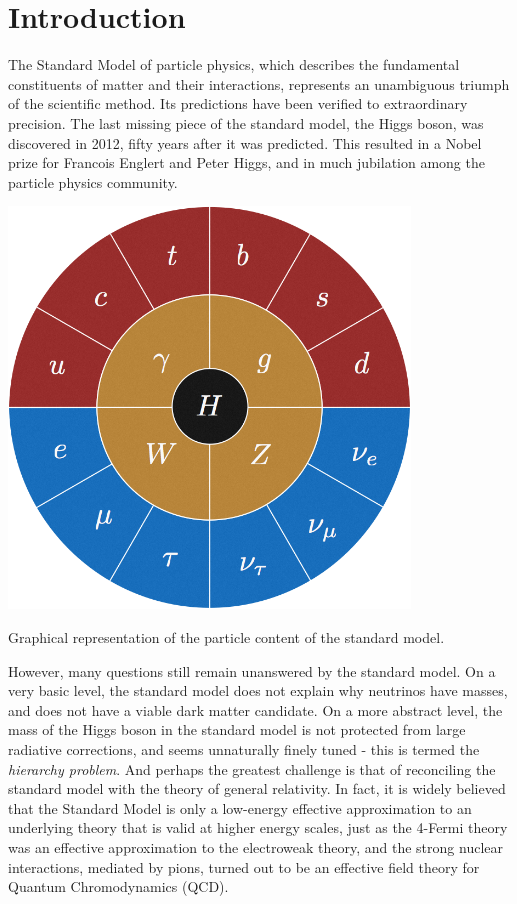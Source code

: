 \chapter{Introduction}

The Standard Model of particle physics, which describes the fundamental constituents of matter and their interactions, represents an unambiguous triumph of the scientific method. Its predictions have been verified to extraordinary precision. The last missing piece of the standard model, the Higgs boson, was discovered in 2012, fifty years after it was predicted. This resulted in a Nobel prize for Francois Englert and Peter Higgs, and in much jubilation among the particle physics community. 

\begin{marginfigure}
  \centering
  \includegraphics[width=0.8\textwidth]{images/SM-wheel.png}
  \caption{Graphical representation of the particle content of the standard model.}
\end{marginfigure}

However, many questions still remain unanswered by the standard model. On a very basic level, the standard model does not explain why neutrinos have masses, and does not have a viable dark matter candidate. On a more abstract level, the mass of the Higgs boson in the standard model is not protected from large radiative corrections, and seems unnaturally finely tuned - this is termed the \emph{hierarchy problem}. And perhaps the greatest challenge is that of reconciling the standard model with the theory of general relativity. In fact, it is widely believed that the Standard Model is only a low-energy effective approximation to an underlying theory that is valid at higher energy scales, just as the 4-Fermi theory was an effective approximation to the electroweak theory, and the strong nuclear interactions, mediated by pions, turned out to be an effective field theory for Quantum Chromodynamics (QCD).

